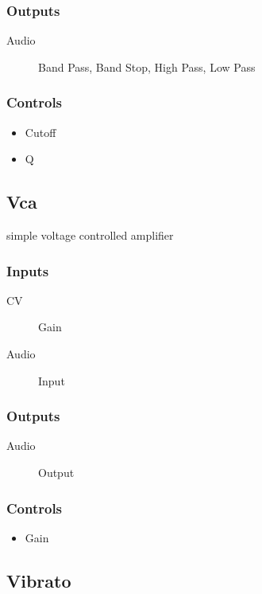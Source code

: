 \subsubsection{Outputs}
\begin{description}
\item [Audio] Band Pass, Band Stop, High Pass, Low Pass
\end{description}

\subsubsection{Controls}
\begin{itemize}
\item Cutoff
\item Q
\end{itemize}

\subsection{Vca}

simple voltage controlled amplifier



\subsubsection{Inputs}
\begin{description}
\item [CV] Gain
\item [Audio] Input
\end{description}

\subsubsection{Outputs}
\begin{description}
\item [Audio] Output
\end{description}

\subsubsection{Controls}
\begin{itemize}
\item Gain
\end{itemize}

\subsection{Vibrato}

